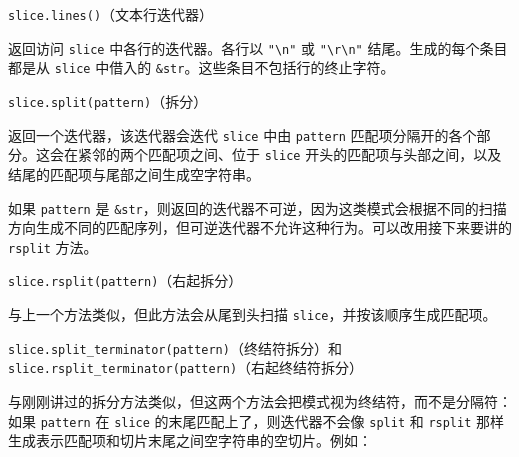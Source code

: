 \begin{mySidenote}
\texttt{slice.lines()}（文本行迭代器）
\end{mySidenote}

返回访问 \texttt{slice} 中各行的迭代器。各行以 \texttt{"\textbackslash{}n"} 或 \texttt{"\textbackslash{}r\textbackslash{}n"} 结尾。生成的每个条目都是从 \texttt{slice} 中借入的 \texttt{\&str}。这些条目不包括行的终止字符。

\begin{mySidenote}
\texttt{slice.split(pattern)}（拆分）
\end{mySidenote}

返回一个迭代器，该迭代器会迭代 \texttt{slice} 中由 \texttt{pattern} 匹配项分隔开的各个部分。这会在紧邻的两个匹配项之间、位于 \texttt{slice} 开头的匹配项与头部之间，以及结尾的匹配项与尾部之间生成空字符串。

如果 \texttt{pattern} 是 \texttt{\&str}，则返回的迭代器不可逆，因为这类模式会根据不同的扫描方向生成不同的匹配序列，但可逆迭代器不允许这种行为。可以改用接下来要讲的 \texttt{rsplit} 方法。

\begin{mySidenote}
\texttt{slice.rsplit(pattern)}（右起拆分）
\end{mySidenote}

与上一个方法类似，但此方法会从尾到头扫描 \texttt{slice}，并按该顺序生成匹配项。

\begin{myNote}
\texttt{slice.split\_terminator(pattern)}（终结符拆分）和 \texttt{slice.rsplit\_terminator(pattern)}（右起终结符拆分）
\end{myNote}

与刚刚讲过的拆分方法类似，但这两个方法会把模式视为终结符，而不是分隔符：如果 \texttt{pattern} 在 \texttt{slice} 的末尾匹配上了，则迭代器不会像 \texttt{split} 和 \texttt{rsplit} 那样生成表示匹配项和切片末尾之间空字符串的空切片。例如：

